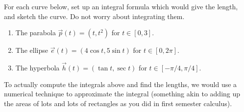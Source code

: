 \begin{problem}
For each curve below, set up an integral formula which would give the length, and sketch the curve. Do not worry about integrating them.  
\begin{enumerate}
\item The parabola $\vec p(t) = (t,t^2)$ for $t\in[0,3]$.
\item The ellipse $\vec e(t) = (4\cos t,5\sin t)$ for $t\in[0,2\pi]$.
\item The hyperbola $\vec h(t) = (\tan t,\sec t)$ for $t\in[-\pi/ 4,\pi/4]$.
\end{enumerate}
\end{problem}
To actually compute the integrals above and find the lengths, we would use a numerical technique to approximate the integral (something akin to adding up the areas of lots and lots of rectangles as you did in first semester calculus).